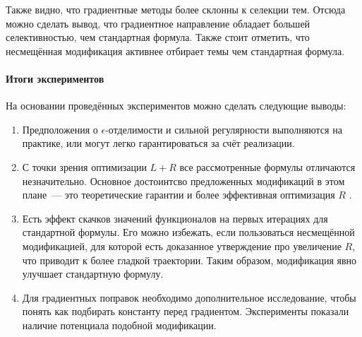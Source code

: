 \documentclass[12pt, twoside]{article}
\begin{document}
Также видно, что градиентные методы более склонны к селекции тем. Отсюда можно сделать вывод, что градиентное направление обладает большей селективностью, чем стандартная формула. Также стоит отметить, что несмещённая модификация активнее отбирает темы чем стандартная формула.
\paragraph{Итоги экспериментов}
На основании проведённых экспериментов можно сделать следующие выводы:
\begin{enumerate}
\item Предположения о $\epsilon$-отделимости и сильной регулярности выполняются на практике, или могут легко гарантироваться за счёт реализации.
\item С точки зрения оптимизации $L + R$ все рассмотренные формулы отличаются незначительно. Основное достоинтсво предложенных модификаций в этом плане~--- это теоретические гарантии и более эффективная оптимизация $R$ .
\item Есть эффект скачков значений функционалов на первых итерациях для стандартной формулы. Его можно избежать, если пользоваться несмещённой модификацией, для которой есть доказанное утверждение про увеличение $R$, что приводит к более гладкой траектории. Таким образом, модификация явно улучшает стандартную формулу.
\item Для градиентных поправок необходимо дополнительное исследование, чтобы понять как подбирать константу перед градиентом. Эксперименты показали наличие потенциала подобной модификации.
\end{enumerate}
\end{document}
